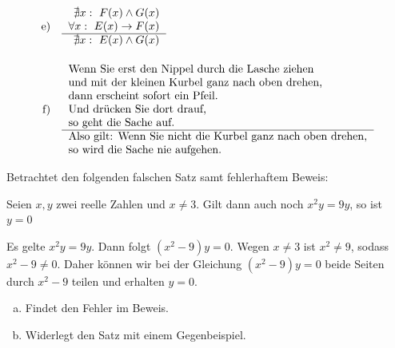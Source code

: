 \begin{aufg}
\begin{align*}
  \text{e)}\quad& \begin{tabular}{r}
    $\nexists x:\ F(x)\land G(x)$ \\
    $\forall x:\ E(x)\to F(x)$ \\
    \hline 
    $\nexists x:\ E(x)\land G(x)$
   \end{tabular}   \\[1em]
 \text{f)}\quad&\begin{tabular}{l}
Wenn Sie erst den Nippel durch die Lasche ziehen \\
und mit der kleinen Kurbel ganz nach oben drehen, \\
dann erscheint sofort ein Pfeil. \\
Und drücken Sie dort drauf, \\
so geht die Sache auf. \\ \hline
Also gilt: Wenn Sie nicht die Kurbel ganz nach oben drehen, \\
so wird die Sache nie aufgehen.
 \end{tabular}
\end{align*}
\end{aufg}





\begin{aufg}[Fehlersuche I]
Betrachtet den folgenden falschen Satz samt fehlerhaftem Beweis:
\begin{sat}
 Seien $x,y$ zwei reelle Zahlen und $x\neq 3$. Gilt dann auch noch $x^2y=9y$, so ist $y=0$
\end{sat}
\begin{bew}
 Es gelte $x^2y=9y$. Dann folgt $(x^2-9)y=0$. Wegen $x\neq 3$ ist $x^2\neq 9$, sodass $x^2-9\neq 0$. Daher können wir bei der Gleichung $(x^2-9)y=0$ beide Seiten durch $x^2-9$ teilen und erhalten $y=0$.
\end{bew}
\begin{enumerate}[a)]
 \item Findet den Fehler im Beweis.
 \item Widerlegt den Satz mit einem Gegenbeispiel.
\end{enumerate}
\end{aufg}




